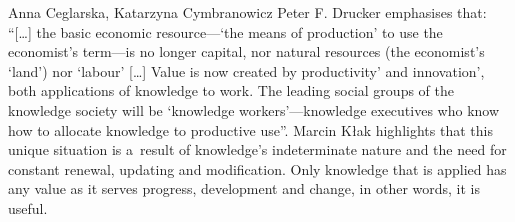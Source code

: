 \begin{artengenv2auth}{Anna Ceglarska, Katarzyna Cymbranowicz}
Peter F. Drucker 
\parencite*[][p.7]{drucker_post-capitalist_2013} %
 emphasises that: ``[…] the basic economic resource---‘the means of production' to use the economist's term---is no longer capital, nor natural resources (the economist's ‘land') nor ‘labour' […] Value is now created by productivity' and innovation', both applications of knowledge to work. The leading social groups of the knowledge society will be ‘knowledge workers'---knowledge executives who know how to allocate knowledge to productive use''. Marcin Kłak 
\parencite*[][p.42]{klak_zarzadzanie_2010} %
 highlights that this unique situation is a~result of knowledge's indeterminate nature and the need for constant renewal, updating and modification. Only knowledge that is applied has any value as it serves progress, development and change, in other words, it is useful.




\end{artengenv2auth}
